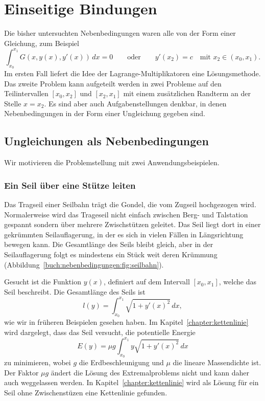 %
%
%
\section{Einseitige Bindungen
\label{buch:nebenbedingungen:section:einseitigebindungen}}
Die bisher untersuchten Nebenbedingungen waren alle von der
Form einer Gleichung, zum Beispiel 
\[
\int_{x_0}^{x_1} G(x,y(x),y'(x))\,dx = 0
\qquad\text{oder}\qquad
y'(x_2) = c \quad\text{mit $x_2\in (x_0,x_1)$.}
\]
Im ersten Fall liefert die Idee der Lagrange-Multiplikatoren
eine Lösungsmethode.
Das zweite Problem kann aufgeteilt werden in zwei Probleme auf
den Teilintervallen $[x_0,x_2]$ und $[x_2,x_1]$ mit einem zusätzlichen
Randterm an der Stelle $x=x_2$.
Es sind aber auch Aufgabenstellungen denkbar, in denen Nebenbedingungen
in der Form einer Ungleichung gegeben sind.

%
%
\subsection{Ungleichungen als Nebenbedingungen
\label{buch:nebenbedingungen:einseitig:subsection:ungleichungen}}
Wir motivieren die Problemstellung mit zwei Anwendungsbeispielen.

%
%
\subsubsection{Ein Seil über eine Stütze leiten}

%
%
Das Tragseil einer Seilbahn trägt die Gondel, die vom Zugseil
hochgezogen wird.
%
Normalerweise wird das Trageseil nicht einfach zwischen Berg- und Talstation
gespannt sondern über mehrere Zwischstützen geleitet.
Das Seil liegt dort in einer gekrümmten Seilauflagerung, in der es sich
in vielen Fällen in Längsrichtung bewegen kann.
Die Gesamtlänge des Seils bleibt gleich, aber in der Seilauflagerung
%
folgt es mindestens ein Stück weit deren Krümmung
(Abbildung~\ref{buch:nebenbedingungen:fig:seilbahn}).

Gesucht ist die Funktion $y(x)$, definiert auf dem Intervall $[x_0,x_1]$,
welche das Seil beschreibt.
Die Gesamtlänge des Seils ist 
\[
l(y) = \int_{x_0}^{x_1} \sqrt{1+y'(x)^2}\,dx,
\]
wie wir in früheren Beispielen gesehen haben.
Im Kapitel~\ref{chapter:kettenlinie} wird dargelegt, dass das Seil
versucht, die potentielle Energie
\begin{equation}
E(y) = \mu g \int_{x_0}^{x_1} y\sqrt{1+y'(x)^2}\,dx
\label{buch:nebenbedingungen:einseitig:eqn:seilE}
\end{equation}
zu minimieren, wobei $g$ die Erdbeschleunigung und $\mu$ die
lineare Massendichte ist.
Der Faktor $\mu g$ ändert die Lösung des Extremalproblems nicht und 
kann daher auch weggelassen werden.
In Kapitel~\ref{chapter:kettenlinie} wird als Lösung für ein Seil
ohne Zwischenstüzen eine Kettenlinie gefunden.

